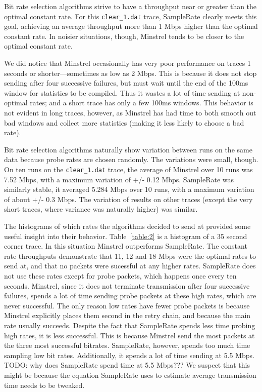 \documentclass[letterpaper,twocolumn,10pt]{article}
\begin{document}
Bit rate selection algorithms strive to have a throughput near or greater than the optimal constant rate. For this \texttt{clear\_1.dat} trace, SampleRate clearly meets this goal, achieving an average throughput more than 1 Mbps higher than the optimal constant rate. In noisier situations, though, Minstrel tends to be closer to the optimal constant rate. 

We did notice that Minstrel occasionally has very poor performance on traces 1 seconds or shorter---sometimes as low as 2 Mbps. This is because it does not stop sending after four successive failures, but must wait until the end of the 100ms window for statistics to be compiled. Thus it wastes a lot of time sending at non-optimal rates; and a short trace has only a few 100ms windows. This behavior is not evident in long traces, however, as Minstrel has had time to both smooth out bad windows and collect more statistics (making it less likely to choose a bad rate).


Bit rate selection algorithms naturally show variation between runs on the same data because probe rates are chosen randomly. The variations were small, though. On ten runs on the \texttt{clear\_1.dat} trace, the average of Minstrel over 10 runs was 7.52 Mbps, with a maximum variation of +/- 0.12 Mbps. SampleRate was similarly stable, it averaged 5.284 Mbps over 10 runs, with a maximum variation of about +/- 0.3 Mbps. The variation of results on other traces (except the very short traces, where variance was naturally higher) was similar.

The histograms of which rates the algorithms decided to send at provided some useful insight into their behavior. Table~\ref{table:2} is a histogram of a 35 second corner trace. In this situation Minstrel outperforms SampleRate. The constant rate throughputs demonstrate that 11, 12 and 18 Mbps were the optimal rates to send at, and that no packets were sucessful at any higher rates. SampleRate does not use these rates except for probe packets, which happens once every ten seconds. Minstrel, since it does not terminate transmission after four successive failures, spends a lot of time sending probe packets at these high rates, which are never successful. The only reason low rates have fewer probe packets is because Minstrel explicitly places them second in the retry chain, and because the main rate usually succeeds. Despite the fact that SampleRate spends less time probing high rates, it is less successful. This is because Minstrel send the most packets at the three most successful bitrates. SampleRate, however, spends too much time sampling low bit rates. Additionally, it spends a lot of time sending at 5.5 Mbps. TODO: why does SampleRate spend time at 5.5 Mbps??? We suspect that this might be because the equation SampleRate uses to estimate average transmission time needs to be tweaked. 
\end{document}
